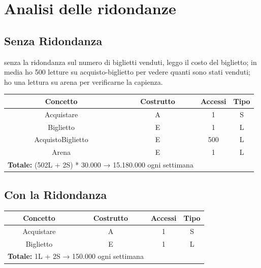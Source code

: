 \documentclass[a4paper,12pt]{report}
\begin{document}
\section{Analisi delle ridondanze}
\subsection*{Senza Ridondanza}
senza la ridondanza sul numero di biglietti venduti, leggo il costo del biglietto; in media ho 500 letture su acquisto-biglietto per vedere quanti sono stati venduti; ho una lettura su arena per verificarne la capienza.
\begin{center}
	\begin{tabular}{|c|c|c|c|}
		\hline\rowcolor{pink}
		Concetto & Costrutto & Accessi & Tipo\\
		\hline\hline		
		Acquistare & A & 1 & S\\
		Biglietto & E & 1 & L\\
		AcquistoBiglietto & E & 500 & L\\
		Arena & E & 1 & L\\
		\hline
		\hline
		\multicolumn{2}{l}{%
			\textbf{Totale:} (502L + 2S) * 30.000 → 15.180.000 ogni settimana} \\
		\hline
	\end{tabular}
\end{center}
\subsection*{Con la Ridondanza}
\begin{center}
	\begin{tabular}{|c|c|c|c|}
		\hline\rowcolor{pink}
		Concetto & Costrutto & Accessi & Tipo\\
		\hline\hline		
		Acquistare & A & 1 & S\\
		Biglietto & E & 1 & L\\		
		\hline
		\hline
		\multicolumn{2}{l}{%
			\textbf{Totale:} 1L + 2S → 150.000 ogni settimana} \\
		\hline
	\end{tabular}
\end{center}
\end{document}

